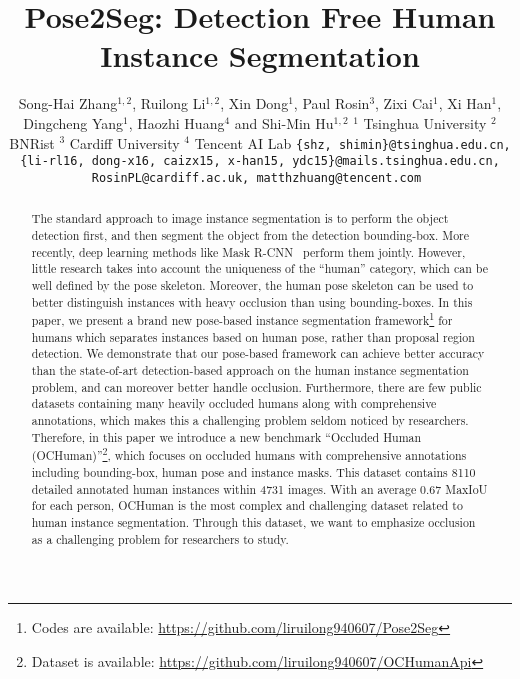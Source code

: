 \documentclass[10pt,twocolumn,letterpaper]{article}
\begin{document}
\title{Pose2Seg: Detection Free Human Instance Segmentation}



\author{
Song-Hai Zhang$^{1,2}$, Ruilong Li$^{1,2}$, Xin Dong$^1$, Paul Rosin$^3$, Zixi Cai$^1$, Xi Han$^1$,  Dingcheng Yang$^1$, Haozhi Huang$^4$ and Shi-Min Hu$^{1,2}$ 
\vskip 0.3cm 
$^1$ Tsinghua University  \quad $^2$ BNRist \quad $^3$ Cardiff University   \quad  $^4$ Tencent AI Lab 
\vskip 0.2cm
{\tt\footnotesize \{shz, shimin\}@tsinghua.edu.cn, \{li-rl16, dong-x16, caizx15, x-han15, ydc15\}@mails.tsinghua.edu.cn, RosinPL@cardiff.ac.uk, matthzhuang@tencent.com
}
}

\maketitle


\begin{abstract}
The standard approach to image instance segmentation is to perform the object detection first, and then segment the object from the detection bounding-box. More recently, deep learning methods like Mask R-CNN~\cite{He2017Mask} perform them jointly. However, little research takes into account the uniqueness of the ``human'' category, which can be well defined by the pose skeleton. Moreover, the human pose skeleton can be used to better distinguish instances with heavy occlusion than using bounding-boxes. In this paper, we present a brand new pose-based instance segmentation framework\footnote{Codes are available: \href{https://github.com/liruilong940607/Pose2Seg}{https://github.com/liruilong940607/Pose2Seg}} for humans which separates instances based on human pose, rather than proposal region detection. We demonstrate that our pose-based framework can achieve better accuracy than the state-of-art detection-based approach on the human instance segmentation problem, and can moreover better handle occlusion.
Furthermore, there are few public datasets containing many heavily occluded humans along with comprehensive annotations, 
which makes this a challenging problem seldom noticed by researchers. 
Therefore, in this paper we introduce a new benchmark ``Occluded Human ({OCHuman})''\footnote{Dataset is available: \href{https://github.com/liruilong940607/OCHumanApi}{https://github.com/liruilong940607/OCHumanApi}}, which focuses on occluded humans with comprehensive annotations including bounding-box, human pose and instance masks.  This dataset contains 8110 detailed annotated human instances within 4731 images. With an average 0.67 {MaxIoU} for each person, {OCHuman} is the most complex and challenging dataset related to human instance segmentation. Through this dataset, we want to emphasize occlusion as a challenging problem for researchers to study.

\end{abstract}
 
\end{document}
